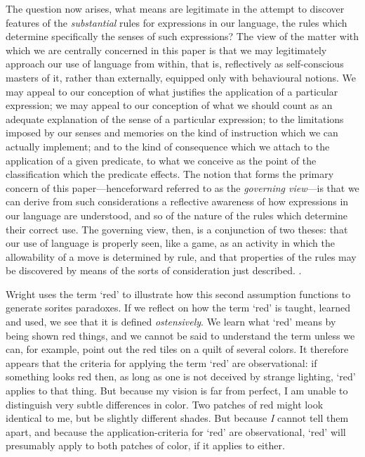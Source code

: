 \documentclass[11pt]{standalone}
\newenvironment{squote}{%
\begin{spacing}{1}
       	\begin{list}{}{%
\setlength{\labelwidth}{0pt}%
\rightmargin\leftmargin%
}
\item\relax
}{%
\end{list}%
\end{spacing}
}
\begin{document}
\begin{spacing}{1.5}
\begin{squote}
The question now arises, what means are legitimate in the attempt to
discover features of the \emph{substantial} rules for expressions in
our language, the rules which determine specifically the senses of
such expressions?  The view of the matter with which we are centrally
concerned in this paper is that we may legitimately approach our use
of language from within, that is, reflectively as self-conscious
masters of it, rather than externally, equipped only with behavioural
notions.  We may appeal to our conception of what justifies the
application of a particular expression; we may appeal to our
conception of what we should count as an adequate explanation of the
sense of a particular expression; to the limitations imposed by our
senses and memories on the kind of instruction which we can actually
implement; and to the kind of consequence which we attach to the
application of a given predicate, to what we conceive as the point of
the classification which the predicate effects.  The notion that forms
the primary concern of this paper---henceforward referred to as the
\emph{governing view}---is that we can derive from such considerations
a reflective awareness of how expressions in our language are
understood, and so of the nature of the rules which determine their
correct use.  The governing view, then, is a conjunction of two
theses: that our use of language is properly seen, like a game, as an
activity in which the allowability of a move is determined by rule,
and that properties of the rules may be discovered by means of the
sorts of consideration just described. \citep[327]{wright1975}.
\end{squote}

Wright uses the term `red' to illustrate how this second assumption
functions to generate sorites paradoxes.  If we reflect on how the
term `red' is taught, learned and used, we see that it is defined
\emph{ostensively}.  We learn what `red' means by being shown red
things, and we cannot be said to understand the term unless we can,
for example, point out the red tiles on a quilt of several colors.  It
therefore appears that the criteria for applying the term `red' are
observational: if something looks red then, as long as one is not
deceived by strange lighting, `red' applies to that thing.  But
because my vision is far from perfect, I am unable to distinguish very
subtle differences in color.  Two patches of red might look identical
to me, but be slightly different shades.  But because \emph{I} cannot
tell them apart, and because the application-criteria for `red' are
observational, `red' will presumably apply to both patches of color,
if it applies to either.


\end{spacing}
\end{document}
